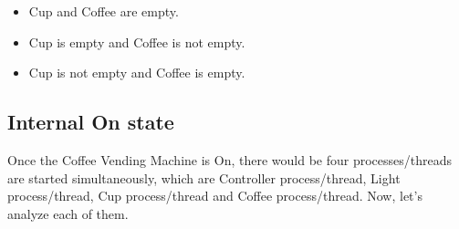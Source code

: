 \documentclass[a4paper]{article}
\begin{document}
\begin{itemize}
	\item Cup and Coffee are empty.
	\item Cup is empty and Coffee is not empty.
	\item Cup is not empty and Coffee is empty.
\end{itemize}

\subsection{Internal On state}
Once the Coffee Vending Machine is On, there would be four processes/threads
are started simultaneously, which are Controller process/thread, Light process/thread,
Cup process/thread and Coffee process/thread. Now, let's analyze each of them.
\end{document}

